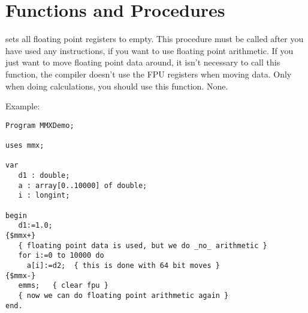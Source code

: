 \section{Functions and Procedures}

{ sets all floating point registers to empty. This procedure must
be called after you have used any  instructions, if you want to use
floating point arithmetic. If you just want to move floating point data
around, it isn't necessary to call this function, the compiler doesn't use
the FPU registers when moving data. Only when doing calculations, you should
use this function.
}
{None.}
{ \progref }
\begin{FPKList}
\item[Example:]
\begin{verbatim}
Program MMXDemo;

uses mmx;

var
   d1 : double;
   a : array[0..10000] of double;
   i : longint;

begin
   d1:=1.0;
{$mmx+}
   { floating point data is used, but we do _no_ arithmetic }
   for i:=0 to 10000 do
     a[i]:=d2;  { this is done with 64 bit moves }
{$mmx-}
   emms;   { clear fpu }
   { now we can do floating point arithmetic again }
end. 
\end{verbatim}
\end{FPKList}